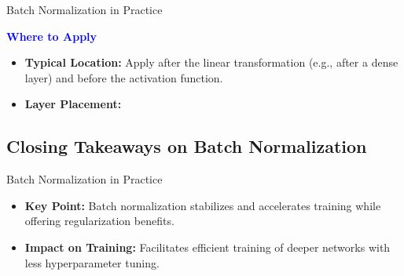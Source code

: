 \documentclass[serif, aspectratio=169]{beamer}
\begin{document}
\begin{frame}{Batch Normalization in Practice}
	
	\textcolor{blue}{\textbf{Where to Apply}}
	
	\begin{itemize}
		\item \textbf{Typical Location:} Apply after the linear transformation (e.g., after a dense layer) and before the activation function.
		\item \textbf{Layer Placement:}
		\newline
		\begin{center}
		\end{center}
	\end{itemize}
	
\end{frame}



\subsection{Closing Takeaways on Batch Normalization}

\begin{frame}{Batch Normalization in Practice}
    
    \begin{itemize}

    \item \textbf{Key Point:} Batch normalization stabilizes and accelerates training while offering regularization benefits.
    \item \textbf{Impact on Training:} Facilitates efficient training of deeper networks with less hyperparameter tuning.

\end{itemize}

\end{frame}
\end{document}
